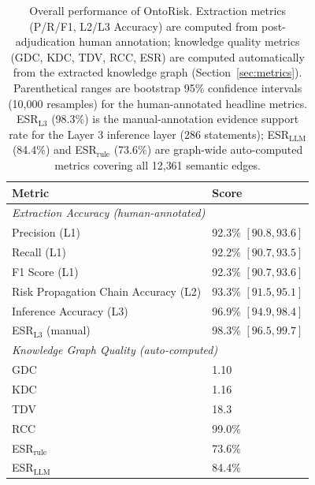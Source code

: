 \documentclass[a4paper,fleqn]{cas-dc}
\begin{document}
\begin{table}[t]
  \centering
  \caption{Overall performance of OntoRisk. Extraction metrics
           (P/R/F1, L2/L3 Accuracy) are computed from
           post-adjudication human annotation; knowledge quality
           metrics (GDC, KDC, TDV, RCC, ESR) are computed
           automatically from the extracted knowledge graph
           (Section~\ref{sec:metrics}). Parenthetical ranges are
           bootstrap 95\% confidence intervals (10{,}000 resamples)
           for the human-annotated headline metrics.
           ESR$_{\text{L3}}$ (98.3\%) is the manual-annotation evidence
           support rate for the Layer 3 inference layer (286 statements);
           ESR$_{\text{LLM}}$ (84.4\%) and ESR$_{\text{rule}}$ (73.6\%)
           are graph-wide auto-computed metrics covering all 12{,}361
           semantic edges.}
  \label{tab:overall}
  \footnotesize
  \setlength{\tabcolsep}{3pt}
  \begin{tabular}{ll}
    \toprule
    \textbf{Metric} & \textbf{Score} \\
    \midrule
    \multicolumn{2}{l}{\textit{Extraction Accuracy (human-annotated)}} \\
    \midrule
    Precision (L1)              & 92.3\% $[90.8, 93.6]$ \\
    Recall (L1)                 & 92.2\% $[90.7, 93.5]$ \\
    F1 Score (L1)               & 92.3\% $[90.7, 93.6]$ \\
    Risk Propagation Chain Accuracy (L2)    & 93.3\% $[91.5, 95.1]$ \\
    Inference Accuracy (L3)     & 96.9\% $[94.9, 98.4]$ \\
    ESR$_{\text{L3}}$ (manual)  & 98.3\% $[96.5, 99.7]$ \\
    \midrule
    \multicolumn{2}{l}{\textit{Knowledge Graph Quality (auto-computed)}} \\
    \midrule
    GDC                         & 1.10 \\
    KDC                         & 1.16 \\
    TDV                         & 18.3 \\
    RCC                         & 99.0\% \\
    ESR$_{\text{rule}}$         & 73.6\% \\
    ESR$_{\text{LLM}}$          & 84.4\% \\
    \bottomrule
  \end{tabular}
\end{table}
\end{document}
